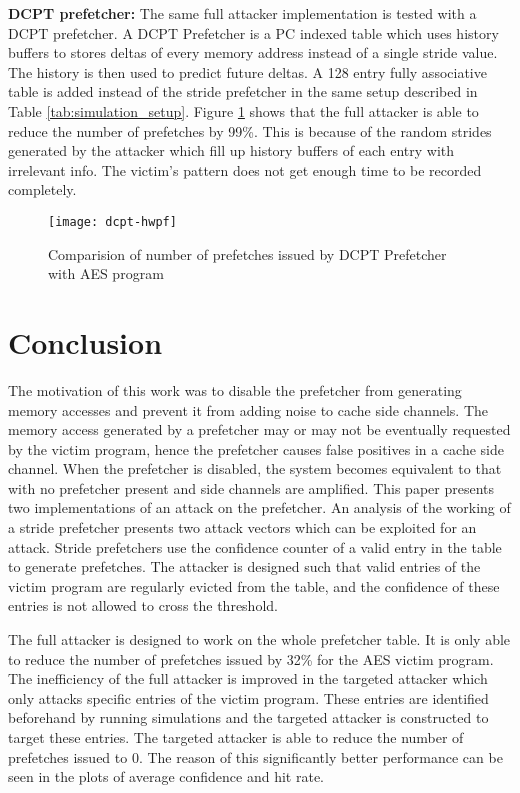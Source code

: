 \textbf{DCPT prefetcher:}
The same full attacker implementation is tested with a DCPT prefetcher.
A DCPT Prefetcher\cite{dcpt} is a PC indexed table which uses history buffers to
stores deltas of every memory address instead of a single stride value.
The history is then used to predict future deltas. A 128 entry fully associative
table is added instead of the stride prefetcher in the same setup described
in Table \ref{tab:simulation_setup}.
Figure \ref{fig:dcpt_hwpf} shows that the full attacker is able to reduce
the number of prefetches by 99\%. This is because of the random strides
generated by the attacker which fill up history buffers of each entry with
irrelevant info. The victim's pattern does not get enough time to be recorded
completely.

\begin{figure}[htbp]
    \centering
    \texttt{[image: dcpt-hwpf]}
    \caption{Comparision of number of prefetches issued by DCPT Prefetcher with AES program}
    \label{fig:dcpt_hwpf}
\end{figure}


\section{Conclusion}

The motivation of this work was to disable the prefetcher from
generating memory accesses and prevent it from adding noise
to cache side channels.
The memory access generated by a prefetcher may or may not be eventually
requested by the victim program, hence the prefetcher causes false
positives in a cache side channel.
When the prefetcher is disabled, the system becomes equivalent to
that with no prefetcher present and side channels are amplified.
This paper presents two implementations of an attack on the prefetcher.
An analysis of the working of a stride prefetcher presents
two attack vectors which can be exploited for an attack.
Stride prefetchers use the confidence counter of a valid entry in the
table to generate prefetches. The attacker is designed such that
valid entries of the victim program are regularly evicted from the table,
and the confidence of these entries is not allowed to cross the threshold.

The full attacker is designed to work on the whole prefetcher table.
It is only able to reduce the number of prefetches issued by 32\% for the
AES victim program. The inefficiency of the full attacker is improved
in the targeted attacker which only attacks specific entries of the victim
program. These entries are identified beforehand by running simulations
and the targeted attacker is constructed to target these entries.
The targeted attacker is able to reduce the number of prefetches issued to
0. The reason of this significantly better performance can be seen
in the plots of average confidence and hit rate.

